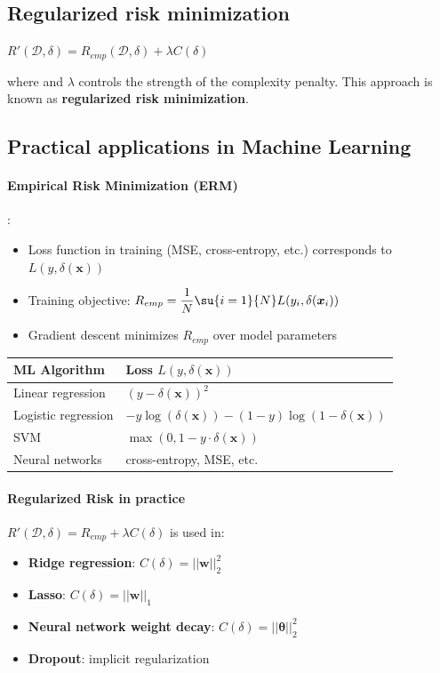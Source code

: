 \subsection{Regularized risk minimization}
\begin{center}
    $R'(\mathcal{D}, \delta) = R_{emp}(\mathcal{D}, \delta) + \lambda C(\delta)$
\end{center}
where  and
$\lambda$ controls the strength of the complexity penalty.
This approach is known as \textbf{regularized risk minimization}.

\subsection{Practical applications in Machine Learning}
\paragraph{Empirical Risk Minimization (ERM)}
:
\begin{itemize}
    \item Loss function in training (MSE, cross-entropy, etc.) corresponds to $L(y, \delta(\bm{x}))$
    \item Training objective: $R_{emp} = \dfrac{1}{N}\su{i=1}{N}L(y_i, \delta(\bm{x}_i))$
    \item Gradient descent minimizes $R_{emp}$ over model parameters
\end{itemize}
\begin{center}
\begin{tabular}{|l|l|}
    \hline
    \textbf{ML Algorithm} & \textbf{Loss} $L(y, \delta(\bm{x}))$ \\
    \hline
    Linear regression & $(y - \delta(\bm{x}))^2$ \\
    Logistic regression & $-y\log(\delta(\bm{x})) - (1-y)\log(1-\delta(\bm{x}))$ \\
    SVM & $\max(0, 1 - y \cdot \delta(\bm{x}))$ \\
    Neural networks & cross-entropy, MSE, etc. \\
    \hline
\end{tabular}
\end{center}

\paragraph{Regularized Risk in practice}
$R'(\mathcal{D}, \delta) = R_{emp} + \lambda C(\delta)$ is used in:
\begin{itemize}
    \item \textbf{Ridge regression}: $C(\delta) = ||\bm{w}||_2^2$
    \item \textbf{Lasso}: $C(\delta) = ||\bm{w}||_1$
    \item \textbf{Neural network weight decay}: $C(\delta) = ||\bm{\theta}||_2^2$
    \item \textbf{Dropout}: implicit regularization
\end{itemize}

